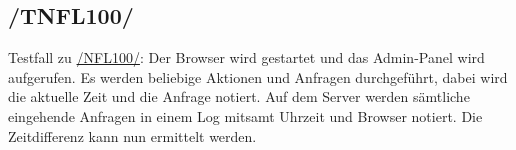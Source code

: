 \subsection*{/TNFL100/}

\label{/TNFL100/} Testfall zu \hyperref[/NFL100/]{/NFL100/}: Der \Gls{Browser} wird gestartet und das \Gls{Admin-Panel} wird aufgerufen.
Es werden beliebige Aktionen und Anfragen durchgeführt, dabei wird die aktuelle Zeit und die Anfrage notiert.
Auf dem Server werden sämtliche eingehende Anfragen in einem \Gls{Log} mitsamt Uhrzeit und \Gls{Browser} notiert.
Die Zeitdifferenz kann nun ermittelt werden.